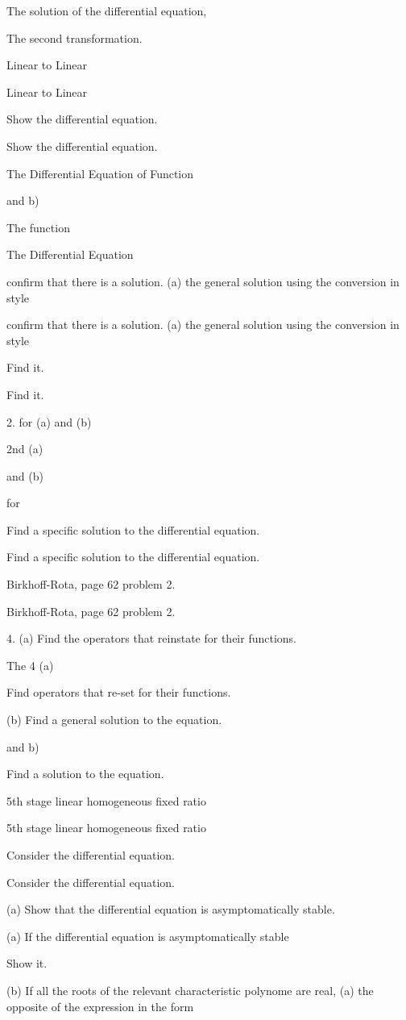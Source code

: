 \documentclass[12pt]{article}
\begin{document}
The solution of the differential equation,

The second transformation.

Linear to Linear

Linear to Linear

Show the differential equation.

Show the differential equation.

The Differential Equation of Function

and b)

The function

The Differential Equation

confirm that there is a solution. (a) the general solution using the conversion in style

confirm that there is a solution. (a) the general solution using the conversion in style

Find it.

Find it.

2. for (a) and (b)

2nd (a)

and (b)

for

Find a specific solution to the differential equation.

Find a specific solution to the differential equation.

Birkhoff-Rota, page 62 problem 2.

Birkhoff-Rota, page 62 problem 2.

4. (a) Find the operators that reinstate for their functions.

The 4 (a)

Find operators that re-set for their functions.

(b) Find a general solution to the equation.

and b)

Find a solution to the equation.

5th stage linear homogeneous fixed ratio

5th stage linear homogeneous fixed ratio

Consider the differential equation.

Consider the differential equation.

(a) Show that the differential equation is asymptomatically stable.

(a) If the differential equation is asymptomatically stable

Show it.

(b) If all the roots of the relevant characteristic polynome are real, (a) the opposite of the expression in the form
\end{document}
